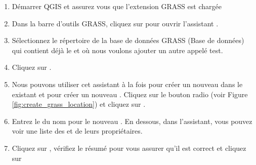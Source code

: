 \begin{enumerate}
  \item Démarrer QGIS et assurez vous que l'extension GRASS est chargée
  \item Dans la barre d'outils GRASS, cliquez sur  pour ouvrir l'assistant .
  \item Sélectionnez le répertoire  de la base de données GRASS (Base de données) qui contient déjà le  et où nous voulons ajouter un autre  appelé test.
  \item Cliquez sur . 
  \item Nous pouvons utiliser cet assistant à la fois pour créer un nouveau  dans le  existant et pour créer un nouveau . Cliquez sur le bouton radio  (voir Figure \ref{fig:create_grass_location}) et cliquez sur .
  \item Entrez le  du nom pour le nouveau . En dessous, dans l'assistant, vous pouvez voir une liste des  et de leurs propriétaires.
  \item Cliquez sur , vérifiez le résumé pour vous assurer qu'il est correct et cliquez sur  
\end{enumerate}

